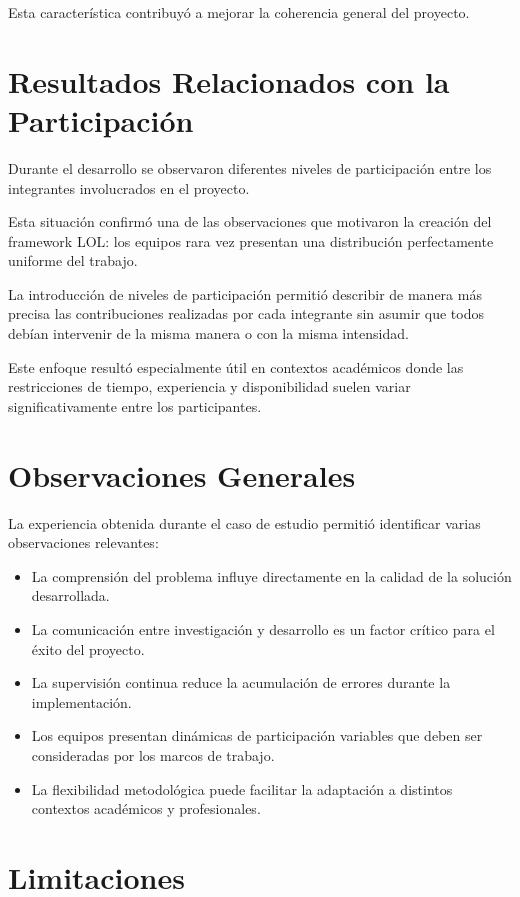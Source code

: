 \documentclass[14pt,a4paper,oneside]{extbook}
\begin{document}
Esta característica contribuyó a mejorar la coherencia general del proyecto.

\section{Resultados Relacionados con la Participación}

Durante el desarrollo se observaron diferentes niveles de participación entre los integrantes involucrados en el proyecto.

Esta situación confirmó una de las observaciones que motivaron la creación del framework LOL: los equipos rara vez presentan una distribución perfectamente uniforme del trabajo.

La introducción de niveles de participación permitió describir de manera más precisa las contribuciones realizadas por cada integrante sin asumir que todos debían intervenir de la misma manera o con la misma intensidad.

Este enfoque resultó especialmente útil en contextos académicos donde las restricciones de tiempo, experiencia y disponibilidad suelen variar significativamente entre los participantes.

\section{Observaciones Generales}

La experiencia obtenida durante el caso de estudio permitió identificar varias observaciones relevantes:

\begin{itemize}
\item La comprensión del problema influye directamente en la calidad de la solución desarrollada.
\item La comunicación entre investigación y desarrollo es un factor crítico para el éxito del proyecto.
\item La supervisión continua reduce la acumulación de errores durante la implementación.
\item Los equipos presentan dinámicas de participación variables que deben ser consideradas por los marcos de trabajo.
\item La flexibilidad metodológica puede facilitar la adaptación a distintos contextos académicos y profesionales.
\end{itemize}
\section{Limitaciones}
\end{document}
